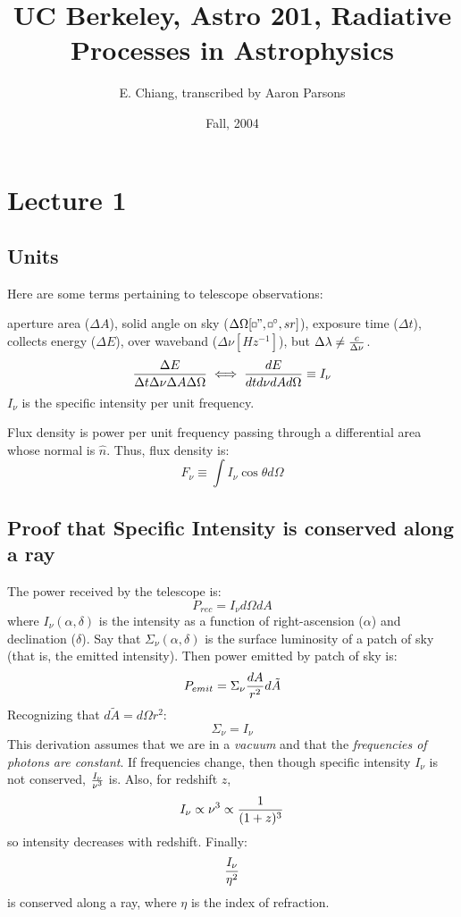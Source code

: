 \documentclass[11pt]{article}
\title{UC Berkeley, Astro 201, Radiative Processes in Astrophysics}
\author{E. Chiang, transcribed by Aaron Parsons}
\date{Fall, 2004}
\def\^{\hat}
\def\inv#1{{1 \over #1}}
\def\sqr#1#2{{\vcenter{\vbox{\hrule height.#2pt
    \hbox{\vrule width.#2pt height#1pt \kern#1pt
        \vrule width.#2pt}
    \hrule height.#2pt}}}}
\def\square{\mathchoice\sqr34\sqr34\sqr{2.1}3\sqr{1.5}3}
\begin{document}
\maketitle

\section*{Lecture 1}

\subsection*{Units}

Here are some terms pertaining to telescope observations:\par
aperture area ($\Delta A$), solid angle on sky ($\Delta \Omega 
[\square ",\square^\circ , sr]$), exposure time ($\Delta t$), collects 
energy ($\Delta E$), over waveband ($\Delta \nu [Hz^{-1}]$), but 
$\Delta\lambda\ne {c\over \Delta\nu}$.
$${\Delta E\over\Delta t\Delta\nu\Delta A\Delta\Omega} \iff
{dE \over dt d\nu dA d\Omega} \equiv I_\nu$$
$I_\nu$ is the specific intensity per unit frequency.

Flux density is power per unit frequency passing through a 
differential area whose normal is $\^n$. Thus, flux density is:
$$\boxed{F_\nu\equiv\int I_\nu\cos\theta d\Omega}$$

\subsection*{ Proof that Specific Intensity is conserved along a ray }

The power received by the telescope is:
$$P_{rec}=I_\nu d\Omega dA$$
where
$I_\nu(\alpha,\delta )$ is the intensity as a function of right-ascension
($\alpha$) and declination ($\delta$).  Say that $\Sigma_\nu(\alpha,\delta)$ 
is the surface luminosity of a patch of sky (that is, the emitted intensity).
Then power emitted by patch of sky is:
$$P_{emit}=\Sigma_\nu{dA\over r^2}d\tilde A$$
Recognizing that $d\tilde A=d\Omega r^2$:
$$\Sigma_\nu=I_\nu$$
This derivation assumes that we are in a {\it vacuum} and that the 
{\it frequencies of photons are constant}.
If frequencies change, then though specific intensity $I_\nu$ is not conserved,
${I_\nu\over\nu^3}$ is.
Also, for redshift $z$,
$$I_\nu\propto\nu^3 \propto\inv{(1+z)^3}$$
so intensity decreases with redshift. Finally:
$${I_\nu\over\eta^2}$$
is conserved along a ray, where $\eta$ is the index of refraction.
\end{document}
